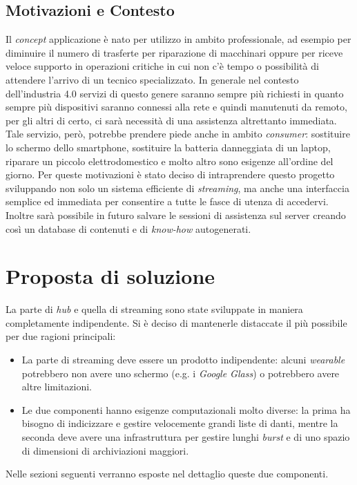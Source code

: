 \documentclass[conference]{IEEEtran}
\begin{document}
	\subsection{Motivazioni e Contesto}
		Il \textit{concept} applicazione è nato per utilizzo in ambito professionale,
		ad esempio per diminuire il numero di trasferte per riparazione di macchinari oppure per 
		riceve veloce supporto in operazioni critiche in cui non c'è tempo o possibilità di attendere
		l'arrivo di un tecnico specializzato. In generale nel contesto dell'industria 4.0 servizi di questo
		genere saranno sempre più richiesti in quanto sempre più dispositivi saranno connessi alla rete
		e quindi manutenuti da remoto, per gli altri di certo, ci sarà necessità di una assistenza altrettanto
		immediata.\\
		Tale servizio, però, potrebbe prendere piede anche in ambito \textit{consumer}: sostituire lo schermo dello smartphone, 
		sostituire la batteria danneggiata di un laptop, riparare un piccolo elettrodomestico e molto altro
		sono esigenze all'ordine del giorno.
		Per queste motivazioni è stato deciso di intraprendere questo progetto sviluppando non solo un sistema
		efficiente di \textit{streaming}, ma anche una interfaccia semplice ed immediata per consentire a tutte
		le fasce di utenza di accedervi. Inoltre sarà possibile in futuro salvare le sessioni di assistenza sul 
		server creando così un database di contenuti e di \textit{know-how} autogenerati.
				





 
\section{Proposta di soluzione}
	La parte di \textit{hub} e quella di streaming sono state sviluppate in maniera completamente indipendente.
	Si è deciso di mantenerle distaccate il più possibile per due ragioni principali:
	\begin{itemize}
		\item La parte di streaming deve essere un prodotto indipendente: alcuni \textit{wearable} potrebbero
		non avere uno schermo (e.g. i \textit{Google Glass}) o potrebbero avere altre limitazioni.
		\item Le due componenti hanno esigenze computazionali molto diverse: la prima ha bisogno di indicizzare e gestire velocemente
		grandi liste di danti, mentre la seconda deve avere una infrastruttura per gestire lunghi \textit{burst} e di uno spazio
		di dimensioni di archiviazioni maggiori.
	\end{itemize}
	Nelle sezioni seguenti verranno esposte nel dettaglio queste due componenti.
\end{document}
